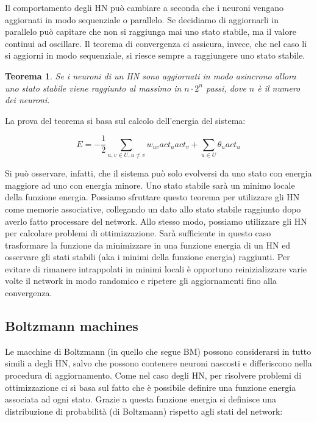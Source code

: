 \documentclass[10pt,a4paper]{article}
\newtheorem{theorem}{Teorema}
\begin{document}
Il comportamento degli HN può cambiare a seconda che i neuroni vengano aggiornati in modo sequenziale o parallelo. Se decidiamo di aggiornarli in parallelo può capitare che non si raggiunga mai uno stato stabile, ma il valore continui ad oscillare. Il teorema di convergenza ci assicura, invece, che nel caso li si aggiorni in modo sequenziale, si riesce sempre a raggiungere uno stato stabile.

\begin{theorem}
\emph{Se i neuroni di un HN sono aggiornati in modo asincrono allora uno stato stabile viene raggiunto al massimo in $n\cdot 2^n$ passi, dove $n$ è il numero dei neuroni.}
\end{theorem}

La prova del teorema si basa sul calcolo dell'energia del sistema:

$$
E = -\frac{1}{2} \sum_{u,v \in U, u \neq v} w_{uv}act_u act_v + \sum_{u \in U} \theta_u act_u
$$

Si può osservare, infatti, che il sistema può solo evolversi da uno stato con energia maggiore ad uno con energia minore. Uno stato stabile sarà un minimo locale della funzione energia. Possiamo sfruttare questo teorema per utilizzare gli HN come memorie associative, collegando un dato allo stato stabile raggiunto dopo averlo fatto processare del network. Allo stesso modo, possiamo utilizzare gli HN per calcolare problemi di ottimizzazione. Sarà sufficiente in questo caso trasformare la funzione da minimizzare in una funzione energia di un HN ed osservare gli stati stabili (aka i minimi della funzione energia) raggiunti. Per evitare di rimanere intrappolati in minimi locali è opportuno reinizializzare varie volte il network in modo randomico e ripetere gli aggiornamenti fino alla convergenza.

\subsection{Boltzmann machines}

Le macchine di Boltzmann (in quello che segue BM) possono considerarsi in tutto simili a degli HN, salvo che possono contenere neuroni nascosti e differiscono nella procedura di aggiornamento. Come nel caso degli HN, per risolvere problemi di ottimizzazione ci si basa sul fatto che è possibile definire una funzione energia associata ad ogni stato. Grazie a questa funzione energia si definisce una distribuzione di probabilità (di Boltzmann) rispetto agli stati del network:
\end{document}
